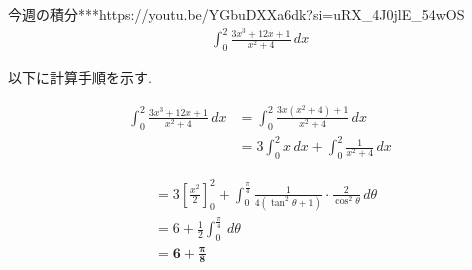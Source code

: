 \documentclass[main]{subfiles}
\begin{document}

\begin{mondai}{10}{今週の積分}{***}{https://youtu.be/YGbuDXXa6dk?si=uRX_4J0jlE_54wOS}
    \begin{align*}
        \int_{0}^{2} \frac{3x^3 + 12x + 1}{x^2 + 4} \, dx
    \end{align*}
\end{mondai}


\solutionhead
\hfill
以下に計算手順を示す.
\hfill\

\begin{align*}
\int_{0}^{2} \frac{3x^3 + 12x + 1}{x^2 + 4} \, dx &= \int_{0}^{2} \frac{3x(x^2+4)+1}{x^2+4} \, dx \\
&= 3\int_{0}^{2} x \, dx + \int_{0}^{2} \frac{1}{x^2+4} \, dx
\end{align*}


\begin{align*}
&= 3 \left[ \frac{x^2}{2} \right]_{0}^{2} + \int_{0}^{\frac{\pi}{4}} \frac{1}{4(\tan^2\theta+1)} \cdot \frac{2}{\cos^2\theta} \, d\theta \\
&= 6 + \frac{1}{2} \int_{0}^{\frac{\pi}{4}} \, d\theta \\
&= \boldsymbol{6 + \frac{\pi}{8}}
\end{align*}
\end{document}
